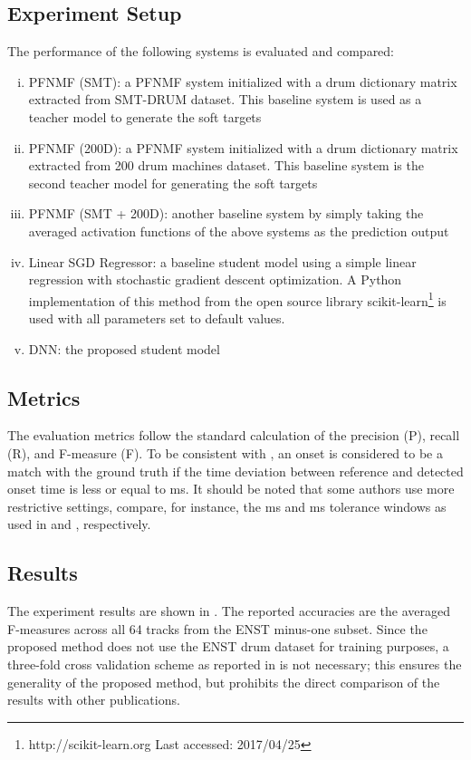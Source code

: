 \documentclass{article}
\begin{document}
\subsection{Experiment Setup}
The performance of the following systems is evaluated and compared: 
\begin{enumerate}[(i)]
\item   PFNMF (SMT): a PFNMF system initialized with a drum dictionary matrix extracted from SMT-DRUM dataset. This baseline system is used as a teacher model to generate the soft targets
\item   PFNMF (200D): a PFNMF system initialized with a drum dictionary matrix extracted from 200 drum machines dataset. This baseline system is the second teacher model for generating the soft targets
\item   PFNMF (SMT + 200D): another baseline system by simply taking the averaged activation functions of the above systems as the prediction output
\item   Linear SGD Regressor: a baseline student model using a simple linear regression with stochastic gradient descent optimization. A Python implementation of this method from the open source library scikit-learn\footnote{http://scikit-learn.org Last accessed: 2017/04/25} is used with all parameters set to default values.
\item   DNN: the proposed student model 
\end{enumerate}







\subsection{Metrics}
The evaluation metrics follow the standard calculation of the precision (P), recall (R), and F-measure (F). To be consistent with \cite{Gillet2008, Wu2015a, Southall2016}, an onset is considered to be a match with the ground truth if the time deviation between reference and detected onset time is less or equal to \unit[50]{ms}. It should be noted that some authors use more restrictive settings, compare, for instance, the \unit[30]{ms} and \unit[20]{ms} tolerance windows as used in \cite{Paulus2009a} and \cite{Vogl2017}, respectively.  

\subsection{Results}
The experiment results are shown in . The reported accuracies are the averaged F-measures across all 64 tracks from the ENST minus-one subset. Since the proposed method does not use the ENST drum dataset for training purposes, a three-fold cross validation scheme as reported in \cite{Paulus2009a, Wu2015a, Vogl2016, Vogl2017, Southall2016} is not necessary; this ensures the generality of the proposed method, but prohibits the direct comparison of the results with other publications.  
\end{document}
